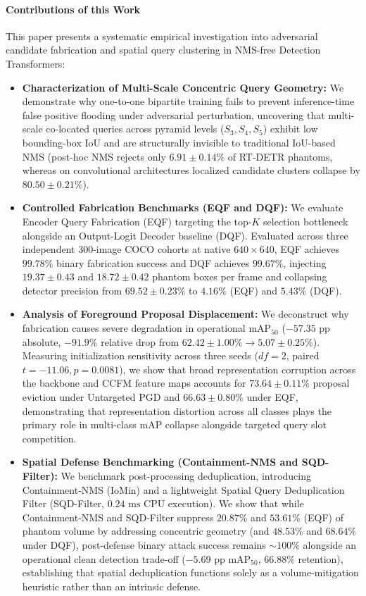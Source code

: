 \documentclass[preprint,12pt]{elsarticle}
\begin{document}
\paragraph{Contributions of this Work}
This paper presents a systematic empirical investigation into adversarial candidate fabrication and spatial query clustering in NMS-free Detection Transformers:
\begin{itemize}
    \item \textbf{Characterization of Multi-Scale Concentric Query Geometry:} We demonstrate why one-to-one bipartite training fails to prevent inference-time false positive flooding under adversarial perturbation, uncovering that multi-scale co-located queries across pyramid levels ($S_3, S_4, S_5$) exhibit low bounding-box IoU and are structurally invisible to traditional IoU-based NMS (post-hoc NMS rejects only $6.91 \pm 0.14\%$ of RT-DETR phantoms, whereas on convolutional architectures localized candidate clusters collapse by $80.50 \pm 0.21\%$).
    \item \textbf{Controlled Fabrication Benchmarks (EQF and DQF):} We evaluate Encoder Query Fabrication (EQF) targeting the top-$K$ selection bottleneck alongside an Output-Logit Decoder baseline (DQF). Evaluated across three independent 300-image COCO cohorts at native $640\times 640$, EQF achieves $99.78\%$ binary fabrication success and DQF achieves $99.67\%$, injecting $19.37 \pm 0.43$ and $18.72 \pm 0.42$ phantom boxes per frame and collapsing detector precision from $69.52 \pm 0.23\%$ to $4.16\%$ (EQF) and $5.43\%$ (DQF).
    \item \textbf{Analysis of Foreground Proposal Displacement:} We deconstruct why fabrication causes severe degradation in operational $\mathrm{mAP}_{50}$ ($-57.35\text{ pp}$ absolute, $-91.9\%$ relative drop from $62.42 \pm 1.00\% \to 5.07 \pm 0.25\%$). Measuring initialization sensitivity across three seeds ($df=2$, paired $t = -11.06, p = 0.0081$), we show that broad representation corruption across the backbone and CCFM feature maps accounts for $73.64 \pm 0.11\%$ proposal eviction under Untargeted PGD and $66.63 \pm 0.80\%$ under EQF, demonstrating that representation distortion across all classes plays the primary role in multi-class mAP collapse alongside targeted query slot competition.
    \item \textbf{Spatial Defense Benchmarking (Containment-NMS and SQD-Filter):} We benchmark post-processing deduplication, introducing Containment-NMS (IoMin) and a lightweight Spatial Query Deduplication Filter (SQD-Filter, $0.24\text{ ms}$ CPU execution). We show that while Containment-NMS and SQD-Filter suppress $20.87\%$ and $53.61\%$ (EQF) of phantom volume by addressing concentric geometry (and $48.53\%$ and $68.64\%$ under DQF), post-defense binary attack success remains $\sim 100\%$ alongside an operational clean detection trade-off ($-5.69\text{ pp}$ $\mathrm{mAP}_{50}$, $66.88\%$ retention), establishing that spatial deduplication functions solely as a volume-mitigation heuristic rather than an intrinsic defense.
\end{itemize}
\end{document}
